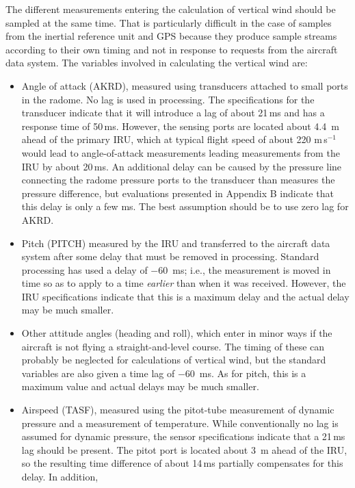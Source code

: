 \documentclass[12pt,twoside,english]{article}\usepackage[]{graphicx}\usepackage[]{color}
\let\OrgIndex\index
\renewcommand*{\index}[1]{\OrgIndex{#1}}
\begin{document}
The different measurements entering the calculation of vertical wind should be sampled at the same time. That is particularly difficult in the case of samples from the inertial reference unit and GPS because they produce sample streams according to their own timing and not in response to requests from the aircraft data system. The variables involved in calculating the vertical wind are:  
\begin{itemize}
\item Angle of attack (AKRD), measured using transducers attached to small ports in the radome. No lag is used in processing. The specifications for the transducer indicate that it will introduce a lag of about 21\,ms and has a response time of 50\,ms. However, the sensing ports are located about 4.4~m ahead of the primary IRU, which at typical flight speed of about 220 m\,s$^{-1}$ would lead to angle-of-attack measurements leading measurements from the IRU by about 20\,ms. 
An additional delay can be caused by the pressure line connecting the radome pressure ports to the transducer than measures the pressure difference, but
evaluations presented in Appendix B indicate that this delay is only a few ms. The best assumption should be to use zero lag for AKRD.
\item Pitch (PITCH) measured by the IRU and transferred to the aircraft data system after some delay that must be removed in processing. Standard processing has used a delay of $-60$~ms; i.e., the measurement is moved in time so as to apply to a time \emph{earlier} than when it was received. However, the IRU specifications indicate that this is a maximum delay and the actual delay may be much smaller.
\item Other attitude angles (heading and roll), which enter in minor ways if the aircraft is not flying a straight-and-level course. The timing of these can probably be neglected for calculations of vertical wind, but the standard variables are also given a time lag of $-60$~ms. As for pitch, this is a maximum value and actual delays may be much smaller.
\item Airspeed (TASF), measured using the pitot-tube measurement of dynamic pressure and a measurement of temperature. While conventionally no lag is assumed for dynamic pressure, the sensor specifications indicate that a 21\,ms lag should be present. The pitot port is located about 3~m ahead of the IRU, so the resulting time difference of about 14\,ms partially compensates for this delay. In addition,

\end{itemize}
\end{document}
